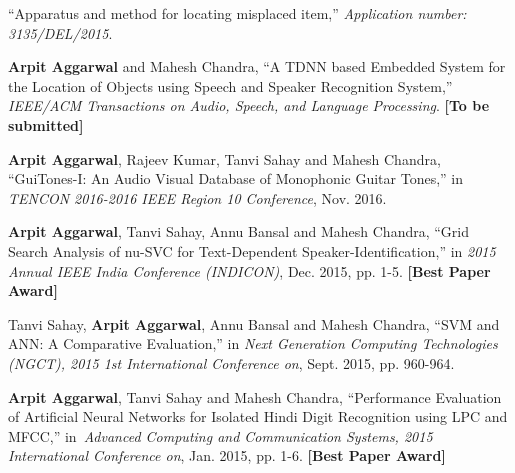 \vspace{-1em}
\begin{cventries}
\cventry
{}
{}
{}
{}
{
 \begin{cvlist}
	\item ``Apparatus and method for locating misplaced item,'' \textit{Application number: 3135/DEL/2015}.
 \end{cvlist}
}
\cventry
{}
{}
{}
{}
{\begin{cvlist}
	\item \textbf{Arpit Aggarwal} and Mahesh Chandra, ``A TDNN based Embedded System for the Location of Objects using Speech and Speaker Recognition System,'' \textit{IEEE/ACM Transactions on Audio, Speech, and Language Processing}. \textbf{[\scriptsize To be submitted]}
 \end{cvlist}
 }
\cventry
{}
{}
{}
{}
{\begin{cvlist}
	\item \textbf{Arpit Aggarwal}, Rajeev Kumar, Tanvi Sahay and Mahesh Chandra, ``GuiTones-I: An Audio Visual Database of Monophonic Guitar Tones,'' in \textit{TENCON 2016-2016 IEEE Region 10 Conference}, Nov. 2016. \href{http://ieeexplore.ieee.org/document/7848049}{}
	\item \textbf{Arpit Aggarwal}, Tanvi Sahay, Annu Bansal and Mahesh Chandra, ``Grid Search Analysis of nu-SVC for Text-Dependent Speaker-Identiﬁcation,'' in \textit{2015 Annual IEEE India Conference (INDICON)}, Dec. 2015, pp. 1-5. \textbf{[\scriptsize Best Paper Award]} \href{http://ieeexplore.ieee.org/document/7443790}{}
	\item Tanvi Sahay, \textbf{Arpit Aggarwal}, Annu Bansal and Mahesh Chandra, ``SVM and ANN: A Comparative Evaluation,'' in \textit{Next Generation Computing Technologies (NGCT), 2015 1st International Conference on}, Sept. 2015, pp. 960-964. \href{http://ieeexplore.ieee.org/document/7375263}{}
	\item \textbf{Arpit Aggarwal}, Tanvi Sahay and Mahesh Chandra, ``Performance Evaluation of Artificial Neural Networks for Isolated Hindi Digit Recognition using LPC and MFCC,'' in~\textit{Advanced Computing and Communication Systems, 2015 International Conference on}, Jan. 2015, pp. 1-6. \textbf{[\scriptsize Best Paper Award]} \href{http://ieeexplore.ieee.org/document/7324099}{}
\end{cvlist}
}
\end{cventries}




